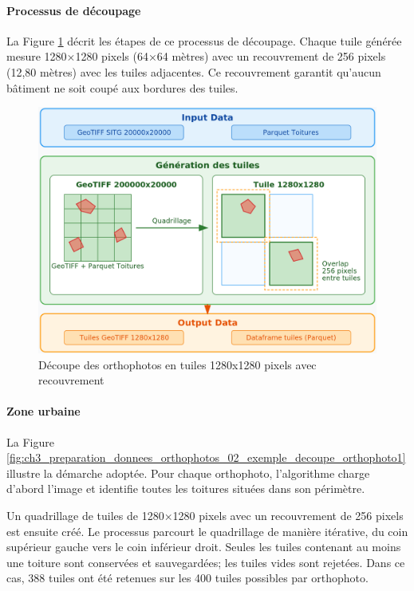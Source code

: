 \paragraph{Processus de découpage}
La Figure \ref{fig:ch3_preparation_donnees_orthophotos_01_etl} décrit les étapes de ce processus de découpage. Chaque tuile générée mesure 1280×1280 pixels (64×64 mètres) avec un recouvrement de 256 pixels (12,80 mètres) avec les tuiles adjacentes. Ce recouvrement garantit qu'aucun bâtiment ne soit coupé aux bordures des tuiles.
\begin{figure}[H]
    \centering
    \includegraphics[width=1\linewidth]{02-main/figures/ch3/ch3_preparation_donnees_orthophotos_01_etl.png}
    \caption{Découpe des orthophotos en tuiles 1280x1280 pixels avec recouvrement}
    \label{fig:ch3_preparation_donnees_orthophotos_01_etl}
\end{figure}

\newpage
\paragraph{Zone urbaine}
La Figure \ref{fig:ch3_preparation_donnees_orthophotos_02_exemple_decoupe_orthophoto1} illustre la démarche adoptée. Pour chaque orthophoto, l'algorithme charge d'abord l'image et identifie toutes les toitures situées dans son périmètre. 

Un quadrillage de tuiles de 1280×1280 pixels avec un recouvrement de 256 pixels est ensuite créé. Le processus parcourt le quadrillage de manière itérative, du coin supérieur gauche vers le coin inférieur droit. Seules les tuiles contenant au moins une toiture sont conservées et sauvegardées; les tuiles vides sont rejetées. Dans ce cas, 388 tuiles ont été retenues sur les 400 tuiles possibles par orthophoto.

